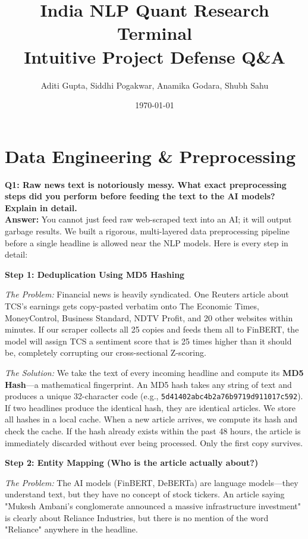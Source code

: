 \documentclass[11pt, a4paper]{article}
\title{\textbf{India NLP Quant Research Terminal} \\ \Large Intuitive Project Defense Q\&A}
\author{Aditi Gupta, Siddhi Pogakwar, Anamika Godara, Shubh Sahu}
\date{\today}
\begin{document}
\maketitle

\section*{Data Engineering \& Preprocessing}

\textbf{\textcolor{IITBlue}{Q1: Raw news text is notoriously messy. What exact preprocessing steps did you perform before feeding the text to the AI models? Explain in detail.}} \\
\textbf{Answer:} You cannot just feed raw web-scraped text into an AI; it will output garbage results. We built a rigorous, multi-layered data preprocessing pipeline before a single headline is allowed near the NLP models. Here is every step in detail:

\vspace{0.5em}
\textbf{Step 1: Deduplication Using MD5 Hashing}

\textit{The Problem:} Financial news is heavily syndicated. One Reuters article about TCS's earnings gets copy-pasted verbatim onto The Economic Times, MoneyControl, Business Standard, NDTV Profit, and 20 other websites within minutes. If our scraper collects all 25 copies and feeds them all to FinBERT, the model will assign TCS a sentiment score that is 25 times higher than it should be, completely corrupting our cross-sectional Z-scoring.

\textit{The Solution:} We take the text of every incoming headline and compute its \textbf{MD5 Hash}—a mathematical fingerprint. An MD5 hash takes any string of text and produces a unique 32-character code (e.g., \texttt{5d41402abc4b2a76b9719d911017c592}). If two headlines produce the identical hash, they are identical articles. We store all hashes in a local cache. When a new article arrives, we compute its hash and check the cache. If the hash already exists within the past 48 hours, the article is immediately discarded without ever being processed. Only the first copy survives.

\vspace{0.5em}
\textbf{Step 2: Entity Mapping (Who is the article actually about?)}

\textit{The Problem:} The AI models (FinBERT, DeBERTa) are language models—they understand text, but they have no concept of stock tickers. An article saying "Mukesh Ambani's conglomerate announced a massive infrastructure investment" is clearly about Reliance Industries, but there is no mention of the word "Reliance" anywhere in the headline.
\end{document}
